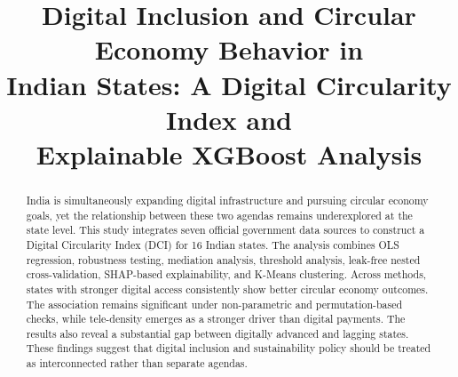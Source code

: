 \documentclass[conference]{IEEEtran}
\begin{document}
\title{Digital Inclusion and Circular Economy Behavior in\\Indian States: A Digital Circularity Index and\\Explainable XGBoost Analysis}

\author{
\and
{}
\and
{}
}

\maketitle

\begin{abstract}
India is simultaneously expanding digital infrastructure and pursuing circular economy goals, yet the relationship between these two agendas remains underexplored at the state level. This study integrates seven official government data sources to construct a Digital Circularity Index (DCI) for 16 Indian states. The analysis combines OLS regression, robustness testing, mediation analysis, threshold analysis, leak-free nested cross-validation, SHAP-based explainability, and K-Means clustering. Across methods, states with stronger digital access consistently show better circular economy outcomes. The association remains significant under non-parametric and permutation-based checks, while tele-density emerges as a stronger driver than digital payments. The results also reveal a substantial gap between digitally advanced and lagging states. These findings suggest that digital inclusion and sustainability policy should be treated as interconnected rather than separate agendas.
\end{abstract}
\end{document}
